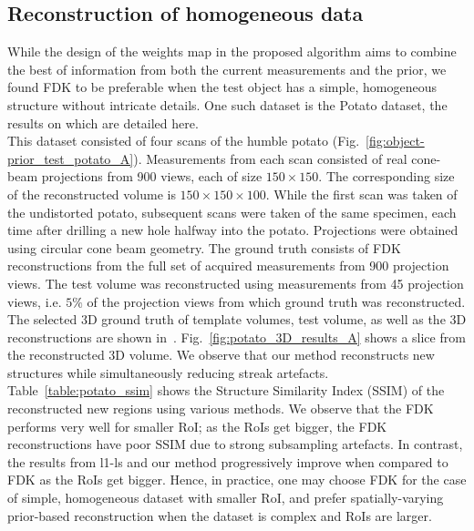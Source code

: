 \documentclass[journal]{IEEEtran}
\begin{document}
\subsection{Reconstruction of homogeneous data}
\label{Sec:potato}
While the design of the weights map in the proposed algorithm aims to combine the best of information from both the current measurements and the prior, we found FDK to be preferable when the test object has a simple, homogeneous structure without intricate details. One such dataset is the Potato dataset, the results on which are detailed here.\\
This dataset consisted of four scans of the humble potato (Fig.~\ref{fig:object-prior_test_potato_A}). Measurements from each scan consisted of real cone-beam projections from 900 views, each of size $150\times150$. The corresponding size of the reconstructed volume is $150\times150\times100$. While the first scan was taken of the undistorted potato, subsequent scans were taken of the same specimen, each time after drilling a new hole halfway into the potato.  Projections were obtained using circular cone beam geometry.  %
The ground truth consists of FDK reconstructions from the full set of acquired measurements from 900 projection views. The test volume was reconstructed using measurements from 45 projection views, i.e. $5\%$ of the projection views from which ground truth was reconstructed.  The selected 3D
ground truth of template volumes, test volume, as well as the 3D reconstructions are shown in~\cite{supp_paper}. Fig.~\ref{fig:potato_3D_results_A} shows a slice from the reconstructed 3D volume. We observe that our method reconstructs new structures while simultaneously reducing streak artefacts.\\ %
Table~\ref{table:potato_ssim} shows the Structure Similarity Index (SSIM) of the reconstructed new regions using various methods. We observe that the FDK performs very well for smaller RoI; as the RoIs get bigger, the FDK reconstructions have poor SSIM due to strong subsampling artefacts. In contrast, the results from l1-ls and our method progressively improve when compared to FDK as the RoIs get bigger. Hence, in practice, one may choose FDK for the case of simple, homogeneous dataset with smaller RoI,  and prefer spatially-varying prior-based reconstruction when the dataset is complex and RoIs are larger.
\end{document}
